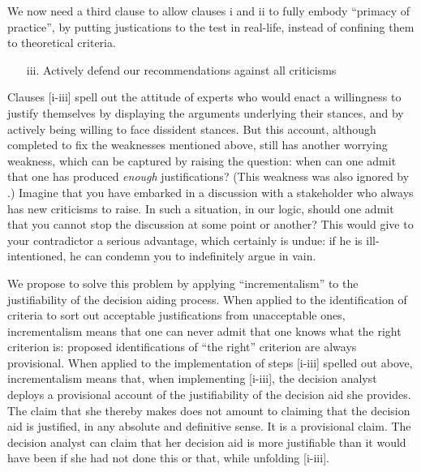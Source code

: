 \documentclass[preprint, french, english, 11pt, authoryear]{elsarticle}%
\begin{document}
We now need a third clause to allow clauses i and ii to fully embody “primacy of practice”, by putting justications to the test in real-life, instead of confining them to theoretical criteria.

\begin{itemize}
\item[iii.]	 Actively defend our recommendations against all criticisms
\end{itemize}

Clauses [i-iii] spell out the attitude of experts who would enact a willingness to justify themselves by displaying the arguments underlying their stances, and by actively being willing to face dissident stances. But this account, although completed to fix the weaknesses mentioned above, still has another worrying weakness, which can be captured by raising the question: when can one admit that one has produced \emph{enough} justifications? (This weakness was also ignored by  \citet{meinard_what_2017}.) Imagine that you have embarked in a discussion with a stakeholder who always has new criticisms to raise. In such a situation, in our logic, should one admit that you cannot stop the discussion at some point or another? This would give to your contradictor a serious advantage, which certainly is undue: if he is ill-intentioned, he can condemn you to indefinitely argue in vain.

We propose to solve this problem by applying ``incrementalism'' to the justifiability of the decision aiding process. When applied to the identification of criteria to sort out acceptable justifications from unacceptable ones, incrementalism means that one can never admit that one knows what the right criterion is: proposed identifications of ``the right'' criterion are always provisional. When applied to the implementation of steps [i-iii] spelled out above, incrementalism means that, when implementing [i-iii], the decision analyst deploys a provisional account of the justifiability of the decision aid she provides. The claim that she thereby makes does not amount to claiming that the decision aid is justified, in any absolute and definitive sense. It is a provisional claim. The decision analyst can claim that her decision aid is more justifiable than it would have been if she had not done this or that, while unfolding [i-iii].
\end{document}
